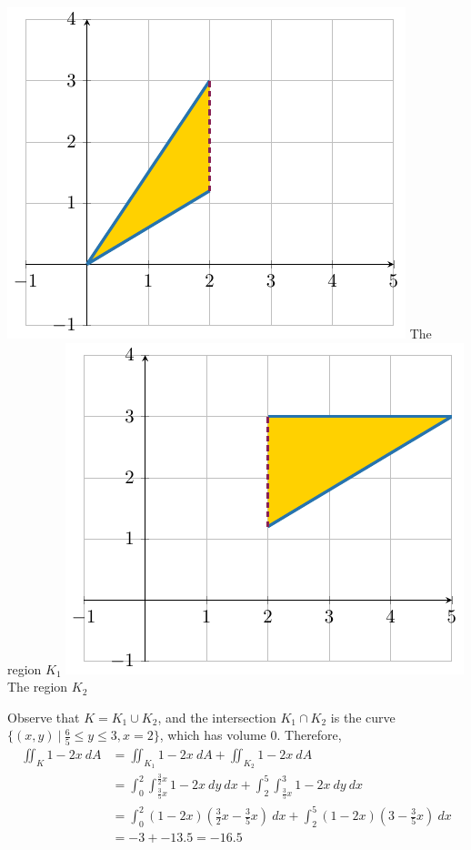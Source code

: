 \begin{example}
    \begin{center}
        \includegraphics{chapters/4-IntegrationRn/figures/figures-decomposek1.pdf}
        The region $K_1$
        \includegraphics{chapters/4-IntegrationRn/figures/figures-decomposek2.pdf}
        The region $K_2$
    \end{center}

    Observe that $K = K_1 \cup K_2$, and the intersection $K_1 \cap K_2$ is the curve $\{(x,y) \ | \ \frac{6}{5} \leq y \leq 3, x=2 \}$, which has volume 0.
    Therefore, 
    \begin{align*}
        \iint_K 1-2x \ dA &= \iint_{K_1} 1-2x \ dA + \iint_{K_2} 1-2x \ dA\\
        &= \int_0^2\int_{\frac{3}{5}x}^{\frac{3}{2}x} 1-2x \ dy \ dx + \int_2^5\int_{\frac{3}{5}x}^{3} 1-2x \ dy \ dx \\
        &= \int_0^2 (1-2x)(\frac{3}{2}x-\frac{3}{5}x) \ dx + \int_2^5 (1-2x)(3-\frac{3}{5}x) \ dx \\
        &= -3 + -13.5 = -16.5        
    \end{align*}
    
    
    
\end{example}

